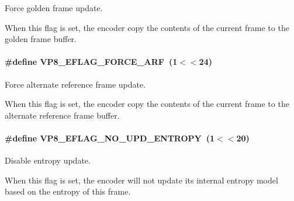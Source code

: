 \-Force golden frame update. 

\-When this flag is set, the encoder copy the contents of the current frame to the golden frame buffer. \hypertarget{group__vp8__encoder_ga50584fe4bdb62ff935347576539650b7}{
\paragraph[{\-V\-P8\-\_\-\-E\-F\-L\-A\-G\-\_\-\-F\-O\-R\-C\-E\-\_\-\-A\-R\-F}]{\setlength{\rightskip}{0pt plus 5cm}\#define {\bf \-V\-P8\-\_\-\-E\-F\-L\-A\-G\-\_\-\-F\-O\-R\-C\-E\-\_\-\-A\-R\-F}~(1$<$$<$24)}}\label{group__vp8__encoder_ga50584fe4bdb62ff935347576539650b7}


\-Force alternate reference frame update. 

\-When this flag is set, the encoder copy the contents of the current frame to the alternate reference frame buffer. \hypertarget{group__vp8__encoder_ga5b91ad179910d4efc23aef66c7b2148b}{
\paragraph[{\-V\-P8\-\_\-\-E\-F\-L\-A\-G\-\_\-\-N\-O\-\_\-\-U\-P\-D\-\_\-\-E\-N\-T\-R\-O\-P\-Y}]{\setlength{\rightskip}{0pt plus 5cm}\#define {\bf \-V\-P8\-\_\-\-E\-F\-L\-A\-G\-\_\-\-N\-O\-\_\-\-U\-P\-D\-\_\-\-E\-N\-T\-R\-O\-P\-Y}~(1$<$$<$20)}}\label{group__vp8__encoder_ga5b91ad179910d4efc23aef66c7b2148b}


\-Disable entropy update. 

\-When this flag is set, the encoder will not update its internal entropy model based on the entropy of this frame. 

